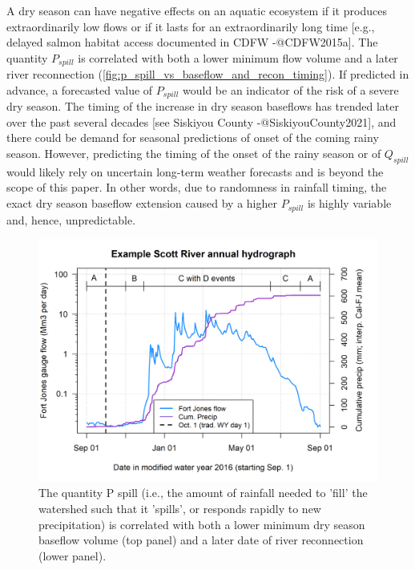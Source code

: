 \documentclass[
]{article}
\begin{document}
A dry season can have negative effects on an aquatic ecosystem if it
produces extraordinarily low flows or if it lasts for an extraordinarily
long time {[}e.g., delayed salmon habitat access documented in CDFW
-@CDFW2015a{]}. The quantity \(P_{spill}\) is correlated with both a
lower minimum flow volume and a later river reconnection
(\autoref{fig:p_spill_vs_baseflow_and_recon_timing}). If predicted in
advance, a forecasted value of \(P_{spill}\) would be an indicator of
the risk of a severe dry season. The timing of the increase in dry
season baseflows has trended later over the past several decades {[}see
Siskiyou County -@SiskiyouCounty2021{]}, and there could be demand for
seasonal predictions of onset of the coming rainy season. However,
predicting the timing of the onset of the rainy season or of
\(Q_{spill}\) would likely rely on uncertain long-term weather forecasts
and is beyond the scope of this paper. In other words, due to randomness
in rainfall timing, the exact dry season baseflow extension caused by a
higher \(P_{spill}\) is highly variable and, hence, unpredictable.

\begin{figure}
\includegraphics[width=1\linewidth]{f02} \caption{\label{fig:p_spill_vs_baseflow_and_recon_timing} The quantity P spill (i.e., the amount of rainfall needed to 'fill' the watershed such that it 'spills', or responds rapidly to new precipitation) is correlated with both a lower minimum dry season baseflow volume (top panel) and a later date of river reconnection (lower panel).}\label{fig:p_spill_vs_baseflow_and_recon_timing}
\end{figure}
\end{document}
